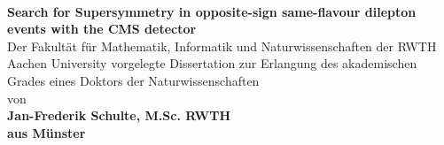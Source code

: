 \thispagestyle{empty}
\begin{center}
  ~ \\
  \vspace{-0.5cm}
 {\huge\bf{Search for Supersymmetry in opposite-sign same-flavour dilepton events with the CMS detector}\\}
  \vspace{2.5cm}
    { Der Fakult\"at f\"ur Mathematik, Informatik und Naturwissenschaften der
RWTH Aachen University vorgelegte Dissertation zur Erlangung des akademischen Grades
eines Doktors der Naturwissenschaften\\}
  \vspace{2.5cm}
    {\Large von}\\
    {\Large\bf Jan-Frederik Schulte, M.Sc. RWTH}\\
    {\Large\bf aus M\"unster } \\
    
\end{center}
\cleardoublepage
\newpage
\newpage